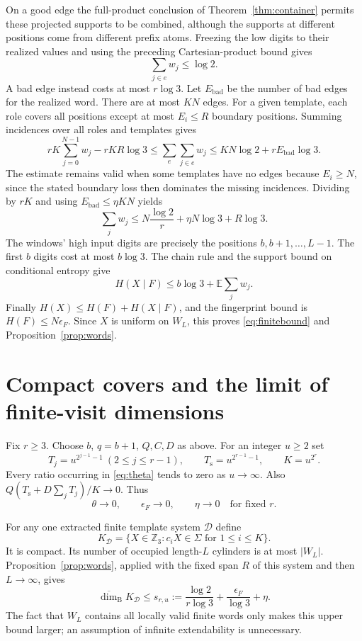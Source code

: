 \documentclass[11pt]{article}
\theoremstyle{definition}
\theoremstyle{remark}
\newcommand{\Z}{\mathbb Z}
\newcommand{\dimB}{\overline{\dim}_{\mathrm B}}
\begin{document}
On a good edge the full-product conclusion of
Theorem~\ref{thm:container} permits these projected supports to be
combined, although the supports at different positions come from
different prefix atoms. Freezing the low digits to their realized
values and using the preceding Cartesian-product bound gives
\[
 \sum_{j\in e}w_j\le\log2.
\]
A bad edge instead costs at most $r\log3$. Let $E_{\mathrm{bad}}$
be the number of bad edges for the realized word. There are at most
$KN$ edges. For a given template, each role covers all positions
except at most $E_i\le R$ boundary positions. Summing incidences
over all roles and templates gives
\[
 rK\sum_{j=0}^{N-1}w_j-rKR\log3
 \le\sum_e\sum_{j\in e}w_j
 \le KN\log2+rE_{\mathrm{bad}}\log3.
\]
The estimate remains valid when some templates have no edges because
$E_i\ge N$, since the stated boundary loss then dominates the
missing incidences. Dividing by $rK$ and using
$E_{\mathrm{bad}}\le\eta KN$ yields
\[
 \sum_jw_j\le N\frac{\log2}{r}+\eta N\log3+R\log3.
\]
The windows' high input digits are precisely the positions
$b,b+1,\ldots,L-1$. The first $b$ digits cost at most $b\log3$.
The chain rule and the support bound on conditional entropy give
\[
 H(X\mid F)\le b\log3+\mathbb E\sum_jw_j.
\]
Finally $H(X)\le H(F)+H(X\mid F)$, and the fingerprint bound is
$H(F)\le N\epsilon_F$. Since $X$ is uniform on $W_L$, this proves
\eqref{eq:finitebound} and Proposition~\ref{prop:words}.

\section{Compact covers and the limit of finite-visit dimensions}

Fix $r\ge3$. Choose $b$, $q=b+1$, $Q,C,D$ as above. For an integer
$u\ge2$ set
\begin{equation}\label{eq:thresholds}
 T_j=u^{2^{j-1}-1}\ (2\le j\le r-1),\qquad
 T_{\mathrm s}=u^{2^{r-1}-1},\qquad K=u^{2^r}.
\end{equation}
Every ratio occurring in \eqref{eq:theta} tends to zero as
$u\to\infty$. Also
$Q(T_{\mathrm s}+D\sum_jT_j)/K\to0$. Thus
\begin{equation}\label{eq:vanishing}
 \theta\longrightarrow0,
 \qquad \epsilon_F\longrightarrow0,
 \qquad \eta\longrightarrow0
 \quad\text{for fixed }r.
\end{equation}

For any one extracted finite template system $\mathcal D$ define
\[
 K_{\mathcal D}=\{X\in\Z_3:c_iX\in\Sigma\text{ for }1\le i\le K\}.
\]
It is compact. Its number of occupied length-$L$ cylinders is at most
$|W_L|$. Proposition~\ref{prop:words}, applied with the fixed span
$R$ of this system and then $L\to\infty$, gives
\begin{equation}\label{eq:box}
 \dimB K_{\mathcal D}\le
 s_{r,u}:=\frac{\log2}{r\log3}+\frac{\epsilon_F}{\log3}+\eta.
\end{equation}
The fact that $W_L$ contains all locally valid finite words only makes
this upper bound larger; an assumption of infinite extendability is
unnecessary.
\end{document}
